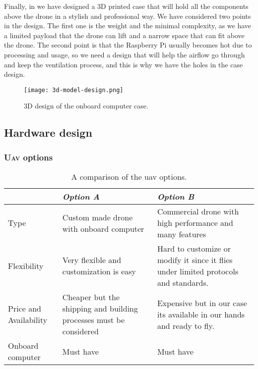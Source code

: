 \documentclass[../main.tex]{subfiles}
\begin{document}
Finally, in  we have designed a 3D printed case that 
will hold all the components above the drone in 
a stylish and professional way. We have considered two 
points in the design. The first one is the weight and the minimal
complexity, as we have a limited payload that the drone 
can lift and a narrow space that can fit above the drone.
The second point is that the Raspberry Pi usually 
becomes hot due to processing and usage, so we need 
a design that will help the airflow go through and keep 
the ventilation process, and this is why we have 
the holes in the case design.   

\begin{figure}[tbp]
	\centering
	\texttt{[image: 3d-model-design.png]}
	\caption{3D design of the onboard computer case.}
	\label{fig:3d-design}
\end{figure}

\subsection{Hardware design}

\subsubsection{\textsc{Uav} options}

\begin{table}[bp]
	\centering
	\caption{A comparison of the \gls{uav} options.}
	\label{tab:alt-solutions}
	\begin{tabularx}{\textwidth}{ p{4cm} X X }
		\toprule
		\textit{} & \textit{Option A} & \textit{Option B}\\ \midrule
		Type  & Custom made drone with onboard computer & 
		Commercial drone with high performance and many features    \\
		Flexibility & Very flexible and customization is easy & 
		Hard to customize or modify it since it flies under 
		limited protocols and standards. \\
		
		Price and Availability & Cheaper but the shipping and 
		building processes must be considered & Expensive but 
		in our case its available in our hands and ready to fly.   \\
		
		Onboard computer & Must have & Must have \\
		\bottomrule
	\end{tabularx}
\end{table} 
\end{document}
